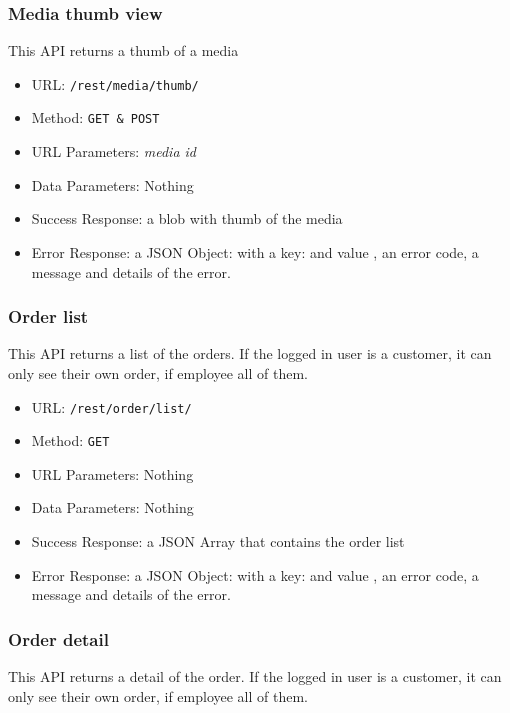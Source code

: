 \subsubsection*{Media thumb view}

This API returns a thumb of a media

\begin{itemize}
    \item URL: \texttt{/rest/media/thumb/}
    \item Method: \texttt{GET \& POST}
    \item URL Parameters: \textit{media id}
    \item Data Parameters: Nothing
    \item Success Response: a blob with thumb of the media
    \item Error Response: a JSON Object: with a key:   and value , an error code, a message and details of the error.
\end{itemize}


\subsubsection*{Order list}

This API returns a list of the orders.
If the logged in user is a customer, it can only see their own order, if employee all of them.

\begin{itemize}
    \item URL: \texttt{/rest/order/list/}
    \item Method: \texttt{GET}
    \item URL Parameters: Nothing
    \item Data Parameters: Nothing
    \item Success Response: a JSON Array that contains the order list
    \item Error Response: a JSON Object: with a key:   and value , an error code, a message and details of the error.
\end{itemize}

\subsubsection*{Order detail}

This API returns a detail of the order.
If the logged in user is a customer, it can only see their own order, if employee all of them.


